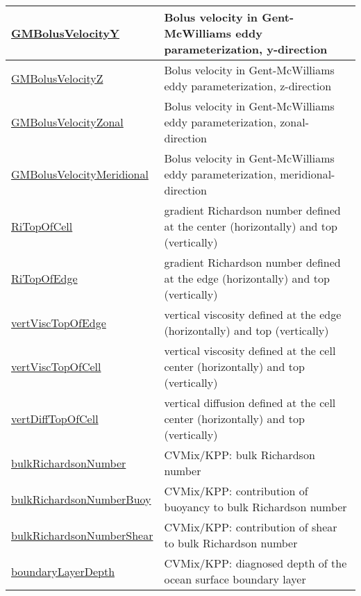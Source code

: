{\begin{center}
\begin{longtable}{| p{2.0in} | p{4.0in} |}
	\hline
	\hyperref[subsec:var_sec_diagnostics_GMBolusVelocityY]{GMBolusVelocityY} & Bolus velocity in Gent-McWilliams eddy parameterization, y-direction \\
	\hline
	\hyperref[subsec:var_sec_diagnostics_GMBolusVelocityZ]{GMBolusVelocityZ} & Bolus velocity in Gent-McWilliams eddy parameterization, z-direction \\
	\hline
	\hyperref[subsec:var_sec_diagnostics_GMBolusVelocityZonal]{GMBolusVelocityZonal} & Bolus velocity in Gent-McWilliams eddy parameterization, zonal-direction \\
	\hline
	\hyperref[subsec:var_sec_diagnostics_GMBolusVelocityMeridional]{GMBolusVelocityMeridional} & Bolus velocity in Gent-McWilliams eddy parameterization, meridional-direction \\
	\hline
	\hyperref[subsec:var_sec_diagnostics_RiTopOfCell]{RiTopOfCell} & gradient Richardson number defined at the center (horizontally) and top (vertically) \\
	\hline
	\hyperref[subsec:var_sec_diagnostics_RiTopOfEdge]{RiTopOfEdge} & gradient Richardson number defined at the edge (horizontally) and top (vertically) \\
	\hline
	\hyperref[subsec:var_sec_diagnostics_vertViscTopOfEdge]{vertViscTopOfEdge} & vertical viscosity defined at the edge (horizontally) and top (vertically) \\
	\hline
	\hyperref[subsec:var_sec_diagnostics_vertViscTopOfCell]{vertViscTopOfCell} & vertical viscosity defined at the cell center (horizontally) and top (vertically) \\
	\hline
	\hyperref[subsec:var_sec_diagnostics_vertDiffTopOfCell]{vertDiffTopOfCell} & vertical diffusion defined at the cell center (horizontally) and top (vertically) \\
	\hline
	\hyperref[subsec:var_sec_diagnostics_bulkRichardsonNumber]{bulkRichardsonNumber} & CVMix/KPP: bulk Richardson number \\
	\hline
	\hyperref[subsec:var_sec_diagnostics_bulkRichardsonNumberBuoy]{bulkRichardsonNumberBuoy} & CVMix/KPP: contribution of buoyancy to bulk Richardson number \\
	\hline
	\hyperref[subsec:var_sec_diagnostics_bulkRichardsonNumberShear]{bulkRichardsonNumberShear} & CVMix/KPP: contribution of shear to bulk Richardson number \\
	\hline
	\hyperref[subsec:var_sec_diagnostics_boundaryLayerDepth]{boundaryLayerDepth} & CVMix/KPP: diagnosed depth of the ocean surface boundary layer \\

\end{longtable}
\end{center}}
